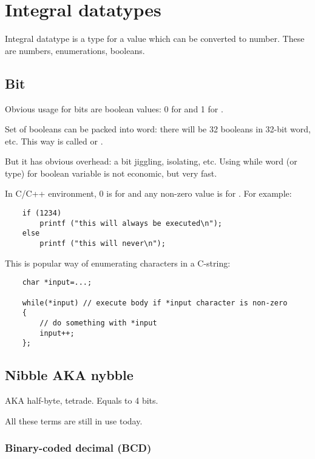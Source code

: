 \section{Integral datatypes}

Integral datatype is a type for a value which can be converted to number.
These are numbers, enumerations, booleans.

\subsection{Bit}

Obvious usage for bits are boolean values: 0 for  and 1 for .

Set of booleans can be packed into \gls{word}: there will be 32 booleans in 32-bit word, etc.
This way is called  or .

But it has obvious overhead: a bit jiggling, isolating, etc.
Using while \gls{word} (or  type) for boolean variable is not economic, but very fast.

In C/C++ environment, 0 is for  and any non-zero value is for .
For example:

\begin{lstlisting}
	if (1234)
		printf ("this will always be executed\n");
	else
		printf ("this will never\n");
\end{lstlisting}

This is popular way of enumerating characters in a C-string:

\begin{lstlisting}
	char *input=...;

	while(*input) // execute body if *input character is non-zero
	{
		// do something with *input
		input++;
	};
\end{lstlisting}

\subsection{Nibble AKA nybble}

\ac{AKA} half-byte, tetrade.
Equals to 4 bits.

All these terms are still in use today.

\subsubsection{Binary-coded decimal (\ac{BCD})}
\label{BCD}

